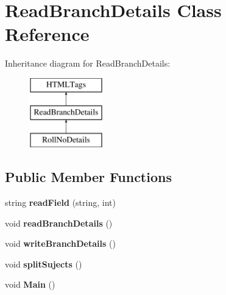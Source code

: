 \hypertarget{classReadBranchDetails}{\section{Read\-Branch\-Details Class Reference}
\label{classReadBranchDetails}
}
Inheritance diagram for Read\-Branch\-Details\-:\begin{figure}[H]
\begin{center}
\leavevmode
\includegraphics[height=3.000000cm]{classReadBranchDetails}
\end{center}
\end{figure}
\subsection*{Public Member Functions}
\begin{DoxyCompactItemize}
\item 
\hypertarget{classReadBranchDetails_a30c9dd7ace2e554db1f94728ff7d537d}{string {\bfseries read\-Field} (string, int)}\label{classReadBranchDetails_a30c9dd7ace2e554db1f94728ff7d537d}

\item 
\hypertarget{classReadBranchDetails_a1d863278ab0f08e9269237526d9fe9ed}{void {\bfseries read\-Branch\-Details} ()}\label{classReadBranchDetails_a1d863278ab0f08e9269237526d9fe9ed}

\item 
\hypertarget{classReadBranchDetails_a93a178fe62791ae6e9e4c5e814432875}{void {\bfseries write\-Branch\-Details} ()}\label{classReadBranchDetails_a93a178fe62791ae6e9e4c5e814432875}

\item 
\hypertarget{classReadBranchDetails_a074e5d092ba4db817ad012332e525723}{void {\bfseries split\-Sujects} ()}\label{classReadBranchDetails_a074e5d092ba4db817ad012332e525723}

\item 
\hypertarget{classReadBranchDetails_ac82cd5c501b266c24d5d2dbbcc1f2549}{void {\bfseries Main} ()}\label{classReadBranchDetails_ac82cd5c501b266c24d5d2dbbcc1f2549}

\end{DoxyCompactItemize}
